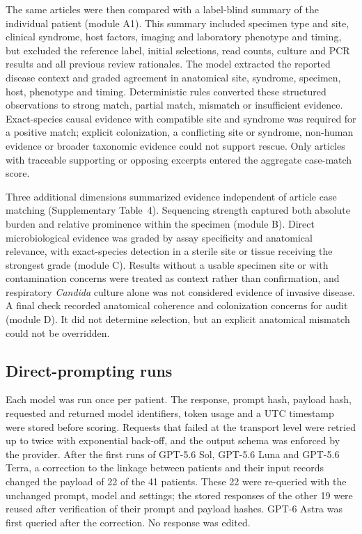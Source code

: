 \documentclass[11pt,a4paper]{article}
\begin{document}
The same articles were then compared with a label-blind summary of the individual patient (module A1). This summary included specimen type and site, clinical syndrome, host factors, imaging and laboratory phenotype and timing, but excluded the reference label, initial selections, read counts, culture and PCR results and all previous review rationales. The model extracted the reported disease context and graded agreement in anatomical site, syndrome, specimen, host, phenotype and timing. Deterministic rules converted these structured observations to strong match, partial match, mismatch or insufficient evidence. Exact-species causal evidence with compatible site and syndrome was required for a positive match; explicit colonization, a conflicting site or syndrome, non-human evidence or broader taxonomic evidence could not support rescue. Only articles with traceable supporting or opposing excerpts entered the aggregate case-match score.

Three additional dimensions summarized evidence independent of article case matching (Supplementary Table~4). Sequencing strength captured both absolute burden and relative prominence within the specimen (module B). Direct microbiological evidence was graded by assay specificity and anatomical relevance, with exact-species detection in a sterile site or tissue receiving the strongest grade (module C). Results without a usable specimen site or with contamination concerns were treated as context rather than confirmation, and respiratory \textit{Candida} culture alone was not considered evidence of invasive disease. A final check recorded anatomical coherence and colonization concerns for audit (module D). It did not determine selection, but an explicit anatomical mismatch could not be overridden.

\subsection*{Direct-prompting runs}
Each model was run once per patient. The response, prompt hash, payload hash, requested and returned model identifiers, token usage and a UTC timestamp were stored before scoring. Requests that failed at the transport level were retried up to twice with exponential back-off, and the output schema was enforced by the provider. After the first runs of GPT-5.6 Sol, GPT-5.6 Luna and GPT-5.6 Terra, a correction to the linkage between patients and their input records changed the payload of 22 of the 41 patients. These 22 were re-queried with the unchanged prompt, model and settings; the stored responses of the other 19 were reused after verification of their prompt and payload hashes. GPT-6 Astra was first queried after the correction. No response was edited.
\end{document}
